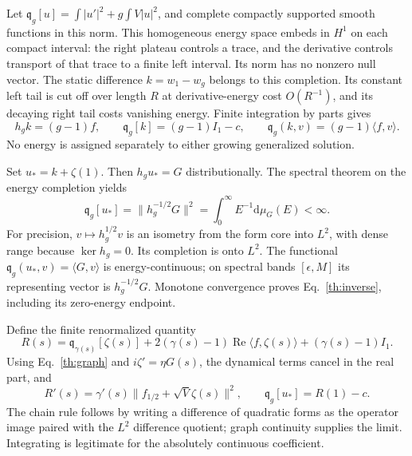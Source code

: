 \documentclass[aps,prl,reprint,superscriptaddress,longbibliography]{revtex4-2}
\newcommand{\dd}{\mathrm{d}}
\begin{document}
Let $\mathfrak q_g[u]=\int|u'|^2+g\int V|u|^2$, and complete compactly supported smooth functions in this norm. This homogeneous energy space embeds in $H^1$ on each compact interval: the right plateau controls a trace, and the derivative controls transport of that trace to a finite left interval. Its norm has no nonzero null vector. The static difference $k=w_1-w_g$ belongs to this completion. Its constant left tail is cut off over length $R$ at derivative-energy cost $O(R^{-1})$, and its decaying right tail costs vanishing energy. Finite integration by parts gives
\begin{equation}
 h_gk=(g-1)f,\qquad \mathfrak q_g[k]=(g-1)I_1-c,
 \qquad \mathfrak q_g(k,v)=(g-1)\langle f,v\rangle.
 \label{th:k}
\end{equation}
No energy is assigned separately to either growing generalized solution.

Set $u_*=k+\zeta(1)$. Then $h_gu_*=G$ distributionally. The spectral theorem on the energy completion yields
\begin{equation}
 \mathfrak q_g[u_*]=\|h_g^{-1/2}G\|^2=\int_0^\infty E^{-1}\dd\mu_G(E)<\infty.
 \label{th:inverse}
\end{equation}
For precision, $v\mapsto h_g^{1/2}v$ is an isometry from the form core into $L^2$, with dense range because $\ker h_g=0$. Its completion is onto $L^2$. The functional $\mathfrak q_g(u_*,v)=\langle G,v\rangle$ is energy-continuous; on spectral bands $[\epsilon,M]$ its representing vector is $h_g^{-1/2}G$. Monotone convergence proves Eq.~\eqref{th:inverse}, including its zero-energy endpoint.

Define the finite renormalized quantity
\begin{equation}
 R(s)=\mathfrak q_{\gamma(s)}[\zeta(s)]
 +2(\gamma(s)-1)\operatorname{Re}\langle f,\zeta(s)\rangle
 +(\gamma(s)-1)I_1.
 \label{th:renormal}
\end{equation}
Using Eq.~\eqref{th:graph} and $i\zeta'=\eta G(s)$, the dynamical terms cancel in the real part, and
\begin{equation}
 R'(s)=\gamma'(s)\|f_{1/2}+\sqrt V\zeta(s)\|^2,
 \qquad \mathfrak q_g[u_*]=R(1)-c.\label{th:balance}
\end{equation}
The chain rule follows by writing a difference of quadratic forms as the operator image paired with the $L^2$ difference quotient; graph continuity supplies the limit. Integrating is legitimate for the absolutely continuous coefficient.
\end{document}
